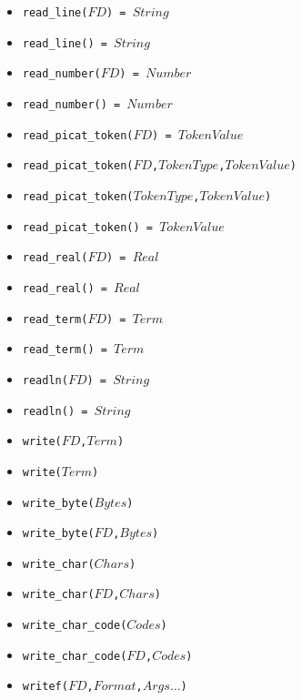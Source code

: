 \documentclass[10pt]{article}
\begin{document}
\begin{multicols}{2}
\begin{scriptsize}
\begin{itemize}
   \item \texttt{read\_line($FD$) = $String$}
   \item \texttt{read\_line() = $String$}
   \item \texttt{read\_number($FD$) = $Number$}
   \item \texttt{read\_number() = $Number$}
   \item \texttt{read\_picat\_token($FD$) = $TokenValue$}
   \item \texttt{read\_picat\_token($FD$,$TokenType$,$TokenValue$)}
   \item \texttt{read\_picat\_token($TokenType$,$TokenValue$)}
   \item \texttt{read\_picat\_token() = $TokenValue$}
   \item \texttt{read\_real($FD$) = $Real$}
   \item \texttt{read\_real() = $Real$}
   \item \texttt{read\_term($FD$) = $Term$}
   \item \texttt{read\_term() = $Term$}
   \item \texttt{readln($FD$) = $String$}
   \item \texttt{readln() = $String$}
   \item \texttt{write($FD$,$Term$)}
   \item \texttt{write($Term$)}
   \item \texttt{write\_byte($Bytes$)}
   \item \texttt{write\_byte($FD$,$Bytes$)}
   \item \texttt{write\_char($Chars$)}
   \item \texttt{write\_char($FD$,$Chars$)}
   \item \texttt{write\_char\_code($Codes$)}
   \item \texttt{write\_char\_code($FD$,$Codes$)}
   \item \texttt{writef($FD$,$Format$,$Args\ldots$)}

\end{itemize}
\end{scriptsize}
\end{multicols}
\end{document}
